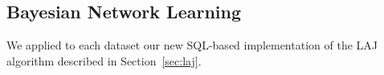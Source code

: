 


\subsection{Bayesian Network Learning} We applied to each dataset our new SQL-based implementation of the LAJ algorithm described in Section~\ref{sec:laj}. 

